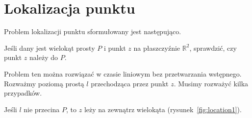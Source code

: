 \newcommand{\convexA}{
  \coordinate (p0) at (4.5,2);
  \coordinate (p1) at (4,3.25);
  \coordinate (p2) at (2,4);
  \coordinate (p3) at (1,3.5);
  \coordinate (p4) at (0,2);
  \coordinate (p5) at (2,0);
  \coordinate (p6) at (3.75,1);

  \draw (p0) -- (p1) -- (p2) -- (p3) -- (p4) -- (p5) -- (p6) -- cycle;
}

\newcommand{\convexB}{
  \coordinate (p0) at (3.5,     4);
  \coordinate (p1) at (1.5,     4.5);
  \coordinate (p2) at (0,       3.5);
  \coordinate (p3) at (-0.5,    1.5);
  \coordinate (p4) at (1.75,    0);
  \coordinate (p5) at (4,       1);

  \draw (p0) -- (p1) -- (p2) -- (p3) -- (p4) -- (p5) -- cycle;
}

\newcommand{\nonconvex}{
  \coordinate (p0) at (4.5,2);
  \coordinate (p1) at (2,4);
  \coordinate (p2) at (0,3);
  \coordinate (p3) at (1.5,2);
  \coordinate (p4) at (2,0);
  \coordinate (p5) at (3,1.5);

  \draw (p0) -- (p1) -- (p2) -- (p3) -- (p4) -- (p5) -- cycle;
}

\chapter{Lokalizacja punktu\label{chap:point_location}}
Problem lokalizacji punktu sformułowany jest następująco.

\begin{problem}
  Jeśli dany jest wielokąt prosty $P$ i punkt $z$ na płaszczyźnie
  $\mathbb{R}^2$, sprawdzić, czy punkt $z$ należy do $P$.
\end{problem}

Problem ten można rozwiązać w czasie liniowym bez przetwarzania
wstępnego. Rozważmy poziomą prostą $l$ przechodząca przez punkt
$z$. Musimy rozważyć kilka przypadków.

Jeśli $l$ nie przecina $P$, to $z$ leży na zewnątrz wielokąta
(rysunek~\ref{fig:location1}).

